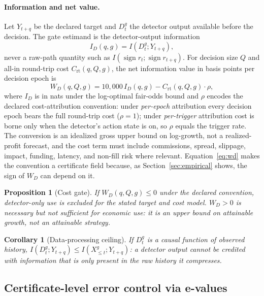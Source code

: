 \documentclass[3p]{elsarticle}
\newtheorem{proposition}{Proposition}
\newtheorem{corollary}{Corollary}
\newcommand{\crt}{\ensuremath{C_{\mathrm{rt}}}}
\begin{document}
\paragraph{Information and net value.} Let $Y_{t+q}$ be the declared target
and $D_t^g$ the detector output available before the decision. The gate
estimand is the detector-output information
\begin{equation}
  I_D(q,g)=I(D_t^g;Y_{t+q}),
  \label{eq:id}
\end{equation}
never a raw-path quantity such as $I(\operatorname{sign} r_t;\operatorname{sign} r_{t+q})$.
For decision size $Q$ and all-in round-trip cost $\crt(q,Q,g)$, the net
information value in basis points per decision epoch is
\begin{equation}
  W_D(q,Q,g)=10{,}000\, I_D(q,g) - \crt(q,Q,g)\cdot \rho,
  \label{eq:wd}
\end{equation}
where $I_D$ is in nats under the log-optimal fair-odds bound
\citep{Kelly1956,AlgoetCover1988,CoverThomas2006} and $\rho$ encodes the
declared cost-attribution convention: under \emph{per-epoch} attribution
every decision epoch bears the full round-trip cost ($\rho=1$); under
\emph{per-trigger} attribution cost is borne only when the detector's action
state is on, so $\rho$ equals the trigger rate.
The conversion is an idealized gross upper bound on log-growth, not a
realized-profit forecast, and the cost term must include commissions, spread,
slippage, impact, funding, latency, and non-fill risk where relevant.
Equation~\eqref{eq:wd} makes the convention a certificate field because, as
Section~\ref{sec:empirical} shows, the sign of $W_D$ can depend on it.

\begin{proposition}[Cost gate]
\label{prop:cost}
If $W_D(q,Q,g)\le 0$ under the declared convention, detector-only use is
excluded for the stated target and cost model. $W_D>0$ is necessary but not
sufficient for economic use: it is an upper bound on attainable growth, not
an attainable strategy.
\end{proposition}

\begin{corollary}[Data-processing ceiling]
\label{cor:dpi}
If $D_t^g$ is a causal function of observed history,
$I(D_t^g;Y_{t+q})\le I(X_{\le t}^g;Y_{t+q})$: a detector output cannot be
credited with information that is only present in the raw history it
compresses.
\end{corollary}

\subsection{Certificate-level error control via e-values}
\label{sec:evalue}
\end{document}
